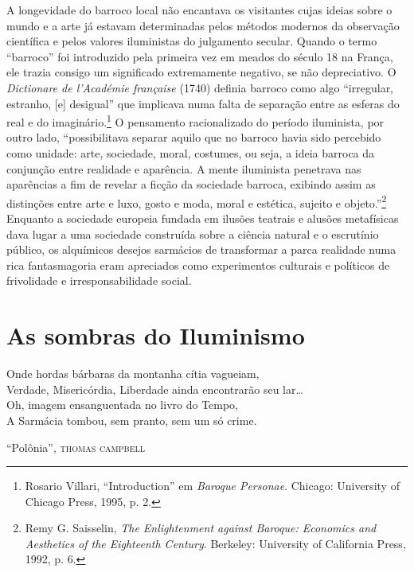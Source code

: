 A longevidade do barroco local não encantava os visitantes cujas ideias
sobre o mundo e a arte já estavam determinadas pelos métodos modernos da
observação científica e pelos valores iluministas do julgamento secular.
Quando o termo ``barroco'' foi introduzido pela primeira vez em meados
do século 18 na França, ele trazia consigo um significado extremamente
negativo, se não depreciativo. O \textit{Dictionare de l'Académie
française} (1740) definia barroco como algo ``irregular, estranho,
{[}e{]} desigual'' que implicava numa falta de separação entre as
esferas do real e do imaginário.\footnote{Rosario Villari, ``Introduction'' em \textit{Baroque Personae}. Chicago: University of Chicago Press, 1995, p. 2.} O pensamento racionalizado do período iluminista, por outro lado, ``possibilitava
separar aquilo que no barroco havia sido percebido como unidade: arte,
sociedade, moral, costumes, ou seja, a ideia barroca da conjunção entre
realidade e aparência. A mente iluminista penetrava nas aparências a fim
de revelar a ficção da sociedade barroca, exibindo assim as distinções
entre arte e luxo, gosto e moda, moral e estética, sujeito e
objeto.''\footnote{Remy G. Saisselin, \textit{The Enlightenment against Baroque: Economics and Aesthetics of the Eighteenth Century}. Berkeley: University of California Press, 1992, p. 6.} Enquanto a sociedade europeia fundada em ilusões teatrais e alusões metafísicas
dava lugar a uma sociedade construída sobre a ciência natural e o
escrutínio público, os alquímicos desejos sarmácios de transformar a
parca realidade numa rica fantasmagoria eram apreciados como
experimentos culturais e políticos de frivolidade e irresponsabilidade
social.

%

\chapter{As sombras do Iluminismo}

\epigraph{Onde hordas bárbaras da montanha cítia vagueiam,\\
Verdade, Misericórdia, Liberdade ainda encontrarão \qb{}seu lar\ldots{}\\
Oh, imagem ensanguentada no livro do Tempo,\\
A Sarmácia tombou, sem pranto, sem um só crime.}{``Polônia'', \textsc{thomas campbell}}

